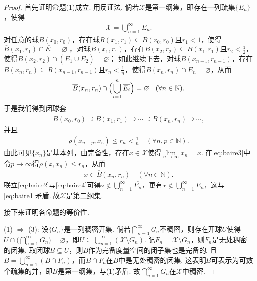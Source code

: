 \documentclass[../../main.tex]{subfiles}%
\begin{document}
\begin{proof}

首先证明命题(1)成立.
用反证法. 倘若$\mathscr{X}$是第一纲集，即存在一列疏集$\{E_n\}$，使得
\begin{align}
\mathscr{X}=\bigcup\limits_{n=1}^{\infty}E_n. \label{eq:baire1}
\end{align}
对任意的球$B(x_0,r_0)$，存在球$B(x_1,r_1)\subseteq B(x_0,r_0)$且$r_1<1$，使得$\overline{B}(x_1,r_1)\cap\overline{E_1}=\varnothing$；
对球$B(x_1,r_1)$，存在$B(x_2,r_2)\subseteq B(x_1,r_1)$且$r_2<\frac{1}{2}$，使得$\overline{B}(x_2,r_2)\cap(\overline{E_1}\cup\overline{E_2})=\varnothing$；
如此继续下去，对球$B(x_{n-1},r_{n-1})$，存在$B(x_n,r_n)\subseteq B(x_{n-1},r_{n-1})$且$r_n<\frac{1}{n}$，使得$\overline{B}(x_n,r_n)\cap\overline{E_n}=\varnothing$，从而
\begin{align}
\overline{B}(x_n,r_n)\cap\Bigl(\bigcup\limits_{i=1}^{n}\overline{E_i}\Bigr)=\varnothing \quad (\forall n\in\mathbb{N}). \label{eq:baire2}
\end{align}
于是我们得到闭球套
\begin{align*}
\overline{B}(x_0,r_0)\supseteq\overline{B}(x_1,r_1)\supseteq\cdots\supseteq\overline{B}(x_n,r_n)\supseteq\cdots,
\end{align*}
并且
\begin{align}
\rho(x_{n+p},x_n)\leqslant r_n<\frac{1}{n}\quad (\forall n,p\in\mathbb{N}). \label{eq:baire3}
\end{align}
由此可见$\{x_n\}$是基本列，由完备性，存在$x\in\mathscr{X}$使得$\lim\limits_{n\to\infty}x_n=x$. 在\eqref{eq:baire3}中令$p\to\infty$得$\rho(x,x_n)\leqslant r_n$，从而
\begin{align}
x\in\overline{B}(x_n,r_n)\quad (\forall n\in\mathbb{N}). \label{eq:baire4}
\end{align}
联立\eqref{eq:baire2}与\eqref{eq:baire4}可得$x\notin\bigcup\limits_{n=1}^{\infty}\overline{E_n}$，更有$x\notin\bigcup\limits_{n=1}^{\infty}E_n$，这与\eqref{eq:baire1}矛盾. 故$\mathscr{X}$是第二纲集.

接下来证明各命题的等价性.

{\heiti (1) $\Rightarrow$ (3):} 设$\{G_n\}$是一列稠密开集. 倘若$\bigcap\limits_{n=1}^{\infty}G_n$不稠密，则存在开球$U$使得$U\cap\bigl(\bigcap\limits_{n=1}^{\infty}G_n\bigr)=\varnothing$，即$U\subseteq\bigcup\limits_{n=1}^{\infty}(\mathscr{X}\setminus G_n)$. 记$F_n=\mathscr{X}\setminus G_n$，则$F_n$是无处稠密的闭集. 取闭球$B\subseteq U$，则$B$作为完备度量空间的闭子集也是完备的. 且$B=\bigcup\limits_{n=1}^{\infty}(B\cap F_n)$，而$B\cap F_n$在$B$中是无处稠密的闭集. 这表明$B$可表示为可数个疏集的并，即$B$是第一纲集，与(1)矛盾. 故$\bigcap\limits_{n=1}^{\infty}G_n$在$\mathscr{X}$中稠密.


\end{proof}
\end{document}
